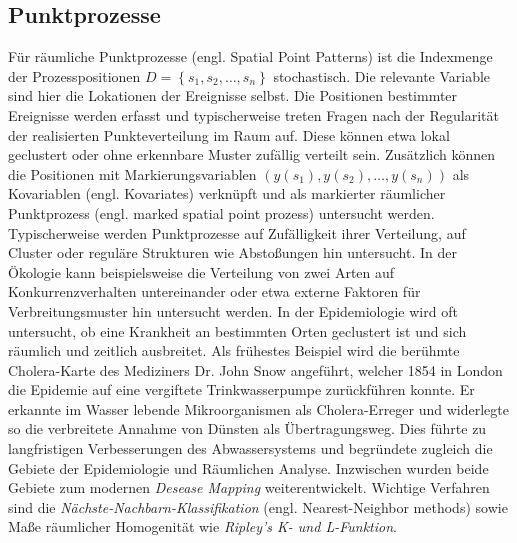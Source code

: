 \subsection*{Punktprozesse}
Für räumliche Punktprozesse (engl. Spatial Point Patterns) ist die 
Indexmenge der Prozesspositionen $D=\left\{  s_1 , s_2 ,\ldots , s_n \right\}$ 
stochastisch. Die relevante Variable sind hier die Lokationen der Ereignisse selbst. 
Die Positionen bestimmter Ereignisse werden erfasst und typischerweise treten Fragen nach 
der Regularität der realisierten Punkteverteilung im Raum auf. Diese können etwa lokal 
geclustert oder ohne erkennbare Muster zufällig verteilt sein. Zusätzlich können die
Positionen mit Markierungsvariablen $ \left( y(s_1),y(s_2),\ldots,y(s_n) \right)$ 
als Kovariablen (engl. Kovariates) verknüpft und als 
markierter räumlicher Punktprozess (engl. marked spatial point prozess) untersucht werden.	
Typischerweise werden Punktprozesse auf Zufälligkeit ihrer Verteilung, auf Cluster oder 
reguläre Strukturen wie Abstoßungen hin untersucht.
In der Ökologie kann beispielsweise die Verteilung von zwei Arten auf 
Konkurrenzverhalten untereinander oder etwa externe Faktoren für Verbreitungsmuster 
hin untersucht werden. In der Epidemiologie wird oft untersucht, ob eine Krankheit 
an bestimmten Orten geclustert ist und sich räumlich und zeitlich ausbreitet. 
Als frühestes Beispiel wird die berühmte Cholera-Karte des Mediziners Dr. John Snow angeführt, 
welcher 1854 in London die Epidemie auf eine vergiftete Trinkwasserpumpe zurückführen konnte. 
Er erkannte im Wasser lebende Mikroorganismen als Cholera-Erreger und widerlegte so die 
verbreitete Annahme von  Dünsten\grqq{} als Übertragungsweg. Dies führte zu 
langfristigen Verbesserungen des Abwassersystems und begründete zugleich die Gebiete 
der Epidemiologie und Räumlichen Analyse. Inzwischen wurden beide Gebiete zum 
modernen \emph{Desease Mapping} weiterentwickelt.
Wichtige Verfahren sind die \emph{Nächste-Nachbarn-Klassifikation} 
(engl. Nearest-Neighbor methods) 
sowie Maße räumlicher Homogenität wie \emph{Ripley's K- und L-Funktion}.

